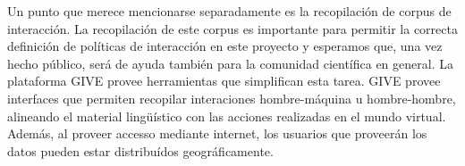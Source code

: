 \begin{myitemize}
Un punto que merece mencionarse separadamente es la recopilaci\'on
de corpus de interacci\'on.  La recopilaci\'on de este corpus es
importante para permitir la correcta definici\'on de pol\'iticas de
interacci\'on en este proyecto y esperamos que, una vez hecho p\'ublico, ser\'a de ayuda tambi\'en para la comunidad cient\'ifica en general. La
plataforma GIVE provee herramientas que simplifican esta tarea.  GIVE
provee interfaces que permiten recopilar interaciones hombre-m\'aquina u
hombre-hombre, alineando el material ling\"u\'istico con las acciones
realizadas en el mundo virtual.  Adem\'as, al proveer
accesso mediante internet, los usuarios que proveer\'an los datos pueden
estar distribu\'idos geogr\'aficamente.
\end{myitemize}

